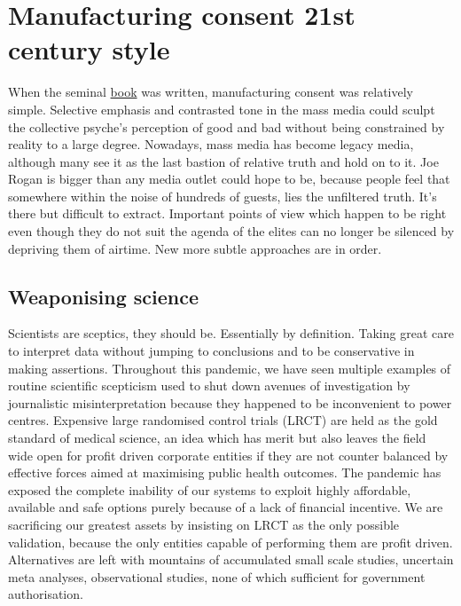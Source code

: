 \documentclass[11pt,a4paper,notitlepage]{report}
\begin{document}
\section*{Manufacturing consent 21st century style}

When the seminal \href{https://en.wikipedia.org/wiki/Manufacturing_Consent}{book} was written, manufacturing consent was  relatively simple. Selective emphasis and contrasted tone in the mass media could sculpt the collective psyche's perception of good and bad without being constrained by reality to a large degree. Nowadays, mass media has become legacy media, although many see it as the last bastion of relative truth and hold on to it. Joe Rogan is bigger than any media outlet could hope to be, because people feel that somewhere within the noise of hundreds of guests, lies the unfiltered truth. It's there but difficult to extract. Important points of view which happen to be right even though they do not suit the agenda of the elites can no longer be silenced by depriving them of airtime. New more subtle approaches are in order.

\subsection*{Weaponising science}

Scientists are sceptics, they should be. Essentially by definition. Taking great care to interpret data without jumping to conclusions and to be conservative in making assertions. Throughout this pandemic, we have seen multiple examples of routine scientific scepticism used to shut down avenues of investigation by journalistic misinterpretation because they happened to be inconvenient to power centres. Expensive large randomised control trials (LRCT) are held as the gold standard of medical science, an idea which has merit but also leaves the field wide open for profit driven corporate entities if they are not counter balanced by effective forces aimed at maximising public health outcomes. The pandemic has exposed the complete inability of our systems to exploit highly affordable, available and safe options purely because of a lack of financial incentive. We are sacrificing our greatest assets by insisting on LRCT as the only possible validation, because the only entities capable of performing them are profit driven. Alternatives are left with mountains of accumulated small scale studies, uncertain meta analyses, observational studies, none of which sufficient for government authorisation.
\end{document}
